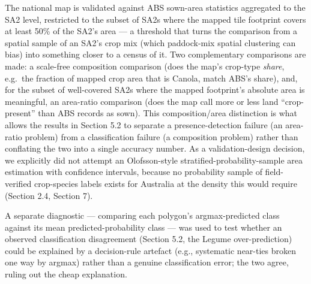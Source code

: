 The national map is validated against ABS sown-area statistics aggregated to the SA2 level, restricted to the subset of SA2s where the mapped tile footprint covers at least 50\% of the SA2's area --- a threshold that turns the comparison from a spatial sample of an SA2's crop mix (which paddock-mix spatial clustering can bias) into something closer to a census of it. Two complementary comparisons are made: a scale-free composition comparison (does the map's crop-type \emph{share}, e.g.~the fraction of mapped crop area that is Canola, match ABS's share), and, for the subset of well-covered SA2s where the mapped footprint's absolute area is meaningful, an area-ratio comparison (does the map call more or less land ``crop-present'' than ABS records as sown). This composition/area distinction is what allows the results in Section 5.2 to separate a presence-detection failure (an area-ratio problem) from a classification failure (a composition problem) rather than conflating the two into a single accuracy number. As a validation-design decision, we explicitly did not attempt an Olofsson-style \citep{olofsson2014goodpractices} stratified-probability-sample area estimation with confidence intervals, because no probability sample of field-verified crop-species labels exists for Australia at the density this would require (Section 2.4, Section 7).

A separate diagnostic --- comparing each polygon's argmax-predicted class against its mean predicted-probability class --- was used to test whether an observed classification disagreement (Section 5.2, the Legume over-prediction) could be explained by a decision-rule artefact (e.g., systematic near-ties broken one way by argmax) rather than a genuine classification error; the two agree, ruling out the cheap explanation.

